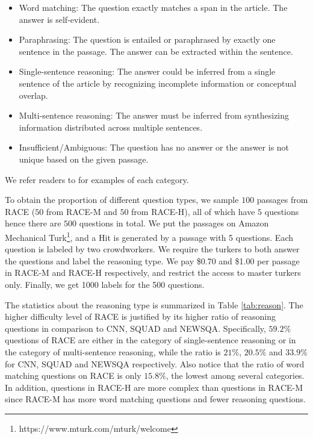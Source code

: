 \begin{itemize}
\item Word matching: The question exactly matches a span in the article. The answer is self-evident. 

\item Paraphrasing: The question is entailed or paraphrased by exactly one sentence in the passage. The answer can be extracted within the sentence. 

\item Single-sentence reasoning: The answer could be inferred from a single sentence of the article by recognizing incomplete information or conceptual overlap. 

\item Multi-sentence reasoning: The answer must be inferred from synthesizing information distributed across multiple sentences. 

\item Insufficient/Ambiguous: The question has no answer or the answer is not unique based on the given passage.  
\end{itemize}

We refer readers to \cite{chen2016thorough,trischler2016newsqa} for examples of each category. 

To obtain the proportion of different question types, we sample $100$ passages from RACE ($50$ from RACE-M and $50$ from RACE-H), all of which have $5$ questions hence there are $500$ questions in total. We put the passages on Amazon Mechanical Turk\footnote{https://www.mturk.com/mturk/welcome}, and a Hit is generated by a passage with 5 questions. Each question is labeled by two crowdworkers. We require the turkers to both answer the questions and label the reasoning type. We pay \$0.70 and \$1.00 per passage in RACE-M and RACE-H respectively, and restrict the access to master turkers only. Finally, we get 1000 labels for the 500 questions. 

The statistics about the reasoning type is summarized in Table \ref{tab:reason}. The higher difficulty level of RACE is justified by its higher ratio of reasoning questions in comparison to CNN, SQUAD and NEWSQA. Specifically,
$59.2\%$ questions of RACE are either in the category of single-sentence reasoning or in the category of multi-sentence reasoning, while the ratio is $21\%$, $20.5\%$ and $33.9\%$ for CNN, SQUAD and NEWSQA respectively. Also notice that the ratio of word matching questions on RACE is only $15.8\%$, the lowest among several categories. In addition, questions in RACE-H are more complex than questions in RACE-M since RACE-M has more word matching questions and fewer reasoning questions. 

